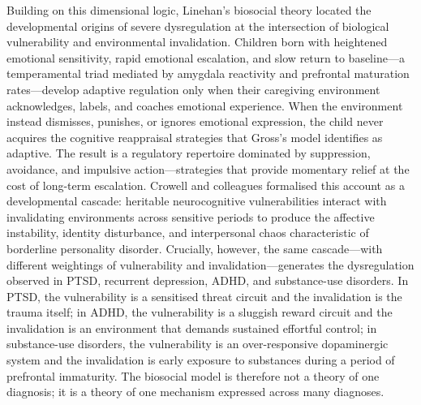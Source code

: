 Building on this dimensional logic, Linehan's biosocial theory located the
developmental origins of severe dysregulation at the intersection of
biological vulnerability and environmental invalidation.  Children
born with heightened emotional sensitivity, rapid emotional escalation, and
slow return to baseline---a temperamental triad mediated by amygdala
reactivity and prefrontal maturation rates---develop adaptive regulation
only when their caregiving environment acknowledges, labels, and coaches
emotional experience.  When the environment instead dismisses, punishes, or
ignores emotional expression, the child never acquires the cognitive
reappraisal strategies that Gross's model identifies as adaptive.  The
result is a regulatory repertoire dominated by suppression, avoidance, and
impulsive action---strategies that provide momentary relief at the cost of
long-term escalation.  Crowell and colleagues formalised this account as a
developmental cascade: heritable neurocognitive vulnerabilities interact
with invalidating environments across sensitive periods to produce the
affective instability, identity disturbance, and interpersonal chaos
characteristic of borderline personality disorder.  Crucially,
however, the same cascade---with different weightings of vulnerability and
invalidation---generates the dysregulation observed in PTSD, recurrent
depression, ADHD, and substance-use disorders.  In PTSD, the vulnerability
is a sensitised threat circuit and the invalidation is the trauma itself;
in ADHD, the vulnerability is a sluggish reward circuit and the
invalidation is an environment that demands sustained effortful control; in
substance-use disorders, the vulnerability is an over-responsive
dopaminergic system and the invalidation is early exposure to substances
during a period of prefrontal immaturity.  The biosocial model is therefore
not a theory of one diagnosis; it is a theory of one mechanism expressed
across many diagnoses.

